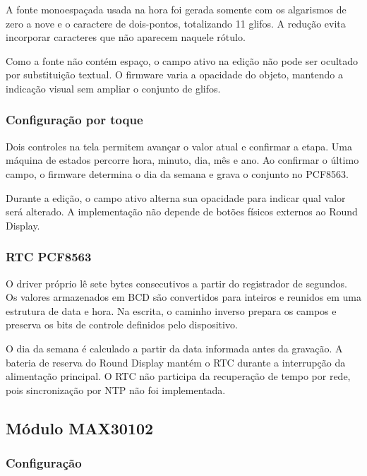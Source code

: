 \documentclass[a4paper,12pt]{article}
\begin{document}
A fonte monoespa\c{c}ada usada na hora foi gerada somente com os algarismos de zero a nove e o caractere de dois-pontos, totalizando 11 glifos. A redu\c{c}\~ao evita incorporar caracteres que n\~ao aparecem naquele r\'otulo.


Como a fonte n\~ao cont\'em espa\c{c}o, o campo ativo na edi\c{c}\~ao n\~ao pode ser ocultado por substitui\c{c}\~ao textual. O firmware varia a opacidade do objeto, mantendo a indica\c{c}\~ao visual sem ampliar o conjunto de glifos.


\subsubsection{Configura\c{c}\~ao por toque}


Dois controles na tela permitem avan\c{c}ar o valor atual e confirmar a etapa. Uma m\'aquina de estados percorre hora, minuto, dia, m\^es e ano. Ao confirmar o \'ultimo campo, o firmware determina o dia da semana e grava o conjunto no PCF8563.


Durante a edi\c{c}\~ao, o campo ativo alterna sua opacidade para indicar qual valor ser\'a alterado. A implementa\c{c}\~ao n\~ao depende de bot\~oes f\'isicos externos ao Round Display.


\subsubsection{RTC PCF8563}


O driver pr\'oprio l\^e sete bytes consecutivos a partir do registrador de segundos. Os valores armazenados em BCD s\~ao convertidos para inteiros e reunidos em uma estrutura de data e hora. Na escrita, o caminho inverso prepara os campos e preserva os bits de controle definidos pelo dispositivo.


O dia da semana \'e calculado a partir da data informada antes da grava\c{c}\~ao. A bateria de reserva do Round Display mant\'em o RTC durante a interrup\c{c}\~ao da alimenta\c{c}\~ao principal. O RTC n\~ao participa da recupera\c{c}\~ao de tempo por rede, pois sincroniza\c{c}\~ao por NTP n\~ao foi implementada.


\subsection{M\'odulo MAX30102}


\subsubsection{Configura\c{c}\~ao}
\end{document}
